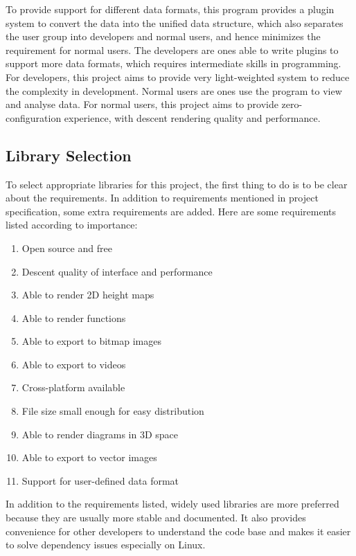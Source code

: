 To provide support for different data formats, this program provides a plugin system to convert the data into the unified data structure, which also separates the user group into developers and normal users, and hence minimizes the requirement for normal users. The developers are ones able to write plugins to support more data formats, which requires intermediate skills in programming. For developers, this project aims to provide very light-weighted system to reduce the complexity in development. Normal users are ones use the program to view and analyse data. For normal users, this project aims to provide zero-configuration experience, with descent rendering quality and performance.

\subsection{Library Selection}

To select appropriate libraries for this project, the first thing to do is to be clear about the requirements. In addition to requirements mentioned in project specification, some extra requirements are added. Here are some requirements listed according to importance:

\begin{enumerate}
	\item Open source and free
	\item Descent quality of interface and performance
	\item Able to render 2D height maps
	\item Able to render functions
	\item Able to export to bitmap images
	\item Able to export to videos
	\item Cross-platform available
	\item File size small enough for easy distribution
	\item Able to render diagrams in 3D space
	\item Able to export to vector images
	\item Support for user-defined data format
\end{enumerate}

In addition to the requirements listed, widely used libraries are more preferred because they are usually more stable and documented. It also provides convenience for other developers to understand the code base and makes it easier to solve dependency issues especially on Linux.

